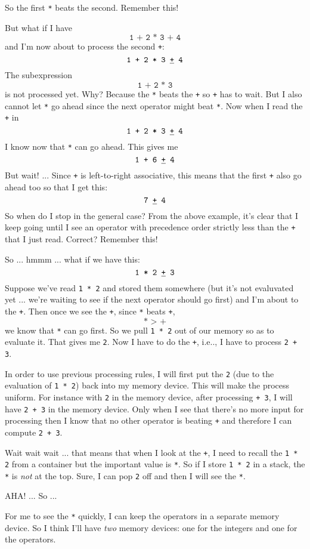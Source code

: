So the first \texttt{*} beats the second.
Remember this!

But what if I have
\[
\texttt{1 + 2 * 3 + 4}
\]
and I'm now about to process the second \texttt{+}:
\[
\texttt{1 + 2 * 3 \underline{+} 4}
\]
The subexpression
\[
\texttt{1 + 2 * 3}
\]
is not processed yet.
Why? Because the \texttt{*} beats the \texttt{+} so \texttt{+}
has to wait.
But I also cannot let \texttt{*} go ahead since
the next operator might beat \texttt{*}.
Now when I read the \texttt{+} in
\[
\texttt{1 + 2 * 3 \underline{+} 4}
\]
I know now that \texttt{*} can go ahead.
This gives me
\[
\texttt{1 + 6 \underline{+} 4}
\]
But wait! ... Since \texttt{+} is left-to-right associative,
this means that
the first \texttt{+} also go ahead too so that I get this:
\[
\texttt{7 \underline{+} 4}
\]
So when do I stop in the general case?
From the above example, it's clear that I keep going until
I see an operator with precedence order strictly less than the \texttt{+}
that I just read.
Correct?
Remember this!

So ... hmmm ... what if we have this:
\[
\text{\texttt{1 * 2 \underline{+} 3}}
\]
Suppose we've read \texttt{1 * 2} and stored them somewhere
(but it's not evaluvated yet ... we're
waiting to see if the next operator should go first)
and I'm about to the \texttt{+}.
Then once we see the \texttt{+}, since \texttt{*} beats \texttt{+},
\[
\texttt{* > +}
\]
we know that \texttt{*} can go first.
So we pull \texttt{1 * 2} out of our memory so as to evaluate it.
That gives me \texttt{2}.
Now I have to do the \texttt{+}, i.e.., I have to process 
\texttt{2 + 3}.

In order to use previous processing rules, I will first put the 
\texttt{2} (due to the evaluation of \texttt{1 * 2})
back into my memory device.
This will make the process uniform.
For instance with \texttt{2} in the memory device, after processing
\texttt{+ 3}, I will have \texttt{2 + 3} in the memory device.
Only when I see that there's no more input for processing then 
I know that no other operator is beating \texttt{+} and therefore
I can compute \texttt{2 + 3}.

Wait wait wait ... that means that when I look at the \texttt{+},
I need to recall the \texttt{1 * 2} from a container but
the important value is \texttt{*}.
So if I store \texttt{1 * 2} in a stack, the \texttt{*} is \textit{not}
at the
top. Sure, I can pop \texttt{2} off and then I will see the \texttt{*}.

AHA! ... So ...

For me to see the \texttt{*} quickly,
I can keep the operators in a separate memory device.
So I think I'll have \textit{two} memory devices:
one for the integers and one for the operators.

